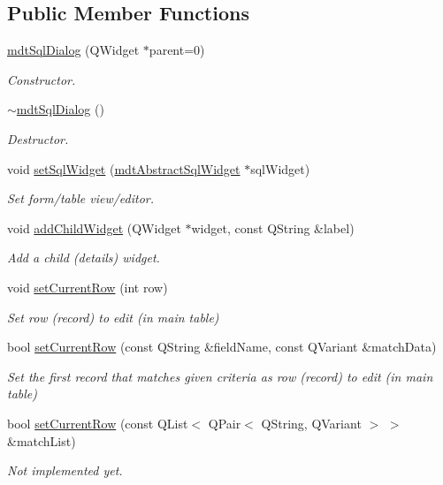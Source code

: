 \subsection*{Public Member Functions}
\begin{DoxyCompactItemize}
\item 
\hyperlink{classmdt_sql_dialog_a9588f53afba818d79ff0f2e9eaeed50f}{mdtSqlDialog} (QWidget $\ast$parent=0)
\begin{DoxyCompactList}\small\item\em Constructor. \end{DoxyCompactList}\item 
\hypertarget{classmdt_sql_dialog_a845d9f4eef1c590d5e854540e18b00a6}{
\hyperlink{classmdt_sql_dialog_a845d9f4eef1c590d5e854540e18b00a6}{$\sim$mdtSqlDialog} ()}
\label{classmdt_sql_dialog_a845d9f4eef1c590d5e854540e18b00a6}

\begin{DoxyCompactList}\small\item\em Destructor. \end{DoxyCompactList}\item 
void \hyperlink{classmdt_sql_dialog_ab9a9ef2972c37349411dff111adf1d25}{setSqlWidget} (\hyperlink{classmdt_abstract_sql_widget}{mdtAbstractSqlWidget} $\ast$sqlWidget)
\begin{DoxyCompactList}\small\item\em Set form/table view/editor. \end{DoxyCompactList}\item 
void \hyperlink{classmdt_sql_dialog_a323e18adf50cd510a1be3e939b936bdb}{addChildWidget} (QWidget $\ast$widget, const QString \&label)
\begin{DoxyCompactList}\small\item\em Add a child (details) widget. \end{DoxyCompactList}\item 
void \hyperlink{classmdt_sql_dialog_ac16f53c307e2b10bcbbc6cc942096dec}{setCurrentRow} (int row)
\begin{DoxyCompactList}\small\item\em Set row (record) to edit (in main table) \end{DoxyCompactList}\item 
bool \hyperlink{classmdt_sql_dialog_abad4c186eedab29b5ad3807aefca5175}{setCurrentRow} (const QString \&fieldName, const QVariant \&matchData)
\begin{DoxyCompactList}\small\item\em Set the first record that matches given criteria as row (record) to edit (in main table) \end{DoxyCompactList}\item 
bool \hyperlink{classmdt_sql_dialog_ae98a1c76a8777664f09106f48386fd57}{setCurrentRow} (const QList$<$ QPair$<$ QString, QVariant $>$ $>$ \&matchList)
\begin{DoxyCompactList}\small\item\em Not implemented yet. \end{DoxyCompactList}\end{DoxyCompactItemize}


